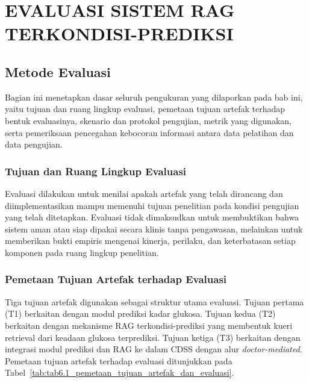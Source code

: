 \cleardoublepage
\chapter{EVALUASI SISTEM RAG TERKONDISI-PREDIKSI}
\label{chap:evaluasi}

\section{Metode Evaluasi}
\label{sec:bab6-metode-evaluasi}

Bagian ini menetapkan dasar seluruh pengukuran yang dilaporkan pada bab ini, yaitu tujuan dan ruang lingkup evaluasi, pemetaan tujuan artefak terhadap bentuk
evaluasinya, skenario dan protokol pengujian, metrik yang digunakan, serta pemeriksaan pencegahan kebocoran informasi antara data pelatihan dan data pengujian.

\subsection{Tujuan dan Ruang Lingkup Evaluasi}
\label{subsec:bab6-tujuan-ruang-lingkup-evaluasi}

Evaluasi dilakukan untuk menilai apakah artefak yang telah dirancang dan diimplementasikan mampu memenuhi tujuan penelitian pada kondisi pengujian yang telah
ditetapkan. Evaluasi tidak dimaksudkan untuk membuktikan bahwa sistem aman atau siap dipakai secara klinis tanpa pengawasan, melainkan untuk memberikan bukti
empiris mengenai kinerja, perilaku, dan keterbatasan setiap komponen pada ruang lingkup penelitian.

\subsection{Pemetaan Tujuan Artefak terhadap Evaluasi}
\label{subsec:bab6-pemetaan-tujuan-artefak}

Tiga tujuan artefak digunakan sebagai struktur utama evaluasi. Tujuan pertama (T1) berkaitan dengan modul prediksi kadar glukosa. Tujuan kedua (T2) berkaitan dengan
mekanisme RAG terkondisi-prediksi yang membentuk kueri retrieval dari keadaan glukosa terprediksi. Tujuan ketiga (T3) berkaitan dengan integrasi
modul prediksi dan RAG ke dalam CDSS dengan alur \textit{doctor-mediated}. Pemetaan tujuan artefak terhadap evaluasi ditunjukkan pada Tabel~\ref{tab:tab6.1_pemetaan_tujuan_artefak_dan_evaluasi}.



